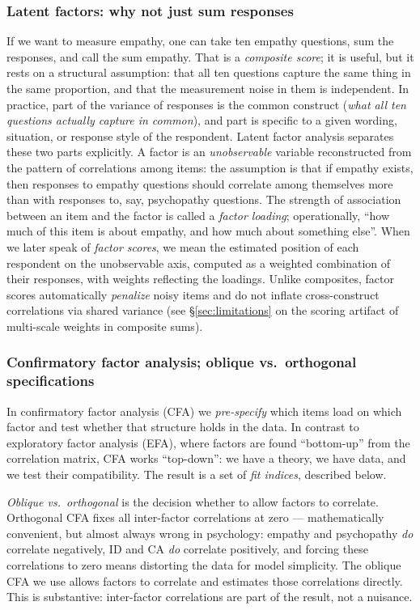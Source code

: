 \subsubsection{Latent factors: why not just sum responses}

If we want to measure empathy, one can take ten empathy questions, sum the responses, and call the sum empathy. That is a \emph{composite score}; it is useful, but it rests on a structural assumption: that all ten questions capture the same thing in the same proportion, and that the measurement noise in them is independent. In practice, part of the variance of responses is the common construct (\emph{what all ten questions actually capture in common}), and part is specific to a given wording, situation, or response style of the respondent. Latent factor analysis separates these two parts explicitly. A factor is an \emph{unobservable} variable reconstructed from the pattern of correlations among items: the assumption is that if empathy exists, then responses to empathy questions should correlate among themselves more than with responses to, say, psychopathy questions. The strength of association between an item and the factor is called a \emph{factor loading}; operationally, ``how much of this item is about empathy, and how much about something else''. When we later speak of \emph{factor scores}, we mean the estimated position of each respondent on the unobservable axis, computed as a weighted combination of their responses, with weights reflecting the loadings. Unlike composites, factor scores automatically \emph{penalize} noisy items and do not inflate cross-construct correlations via shared variance (see §\ref{sec:limitations} on the scoring artifact of multi-scale weights in composite sums).

\subsubsection{Confirmatory factor analysis; oblique vs.\ orthogonal specifications}

In confirmatory factor analysis (CFA) we \emph{pre-specify} which items load on which factor and test whether that structure holds in the data. In contrast to exploratory factor analysis (EFA), where factors are found ``bottom-up'' from the correlation matrix, CFA works ``top-down'': we have a theory, we have data, and we test their compatibility. The result is a set of \emph{fit indices}, described below.

\emph{Oblique vs.\ orthogonal} is the decision whether to allow factors to correlate. Orthogonal CFA fixes all inter-factor correlations at zero --- mathematically convenient, but almost always wrong in psychology: empathy and psychopathy \emph{do} correlate negatively, ID and CA \emph{do} correlate positively, and forcing these correlations to zero means distorting the data for model simplicity. The oblique CFA we use allows factors to correlate and estimates those correlations directly. This is substantive: inter-factor correlations are part of the result, not a nuisance.

